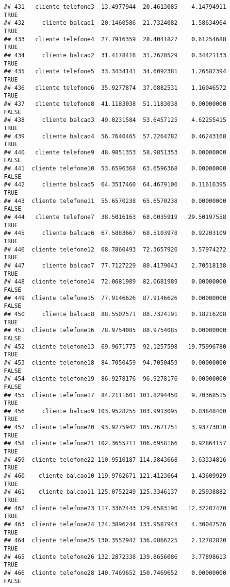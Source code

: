 \documentclass[
]{article}
\begin{document}
\begin{verbatim}
## 431   cliente telefone3  13.4977944  20.4613085    4.14794911     TRUE
## 432     cliente balcao1  20.1460586  21.7324082    1.58634964     TRUE
## 433   cliente telefone4  27.7916359  28.4041827    0.61254688     TRUE
## 434     cliente balcao2  31.4178416  31.7620529    0.34421133     TRUE
## 435   cliente telefone5  33.3434141  34.6092381    1.26582394     TRUE
## 436   cliente telefone6  35.9277874  37.0882531    1.16046572     TRUE
## 437   cliente telefone8  41.1183038  51.1183038    0.00000000    FALSE
## 438     cliente balcao3  49.0231584  53.6457125    4.62255415     TRUE
## 439     cliente balcao4  56.7640465  57.2264782    0.46243168     TRUE
## 440   cliente telefone9  48.9851353  58.9851353    0.00000000    FALSE
## 441  cliente telefone10  53.6596368  63.6596368    0.00000000    FALSE
## 442     cliente balcao5  64.3517460  64.4679100    0.11616395     TRUE
## 443  cliente telefone11  55.6570238  65.6570238    0.00000000    FALSE
## 444   cliente telefone7  38.5016163  68.0035919   29.50197558     TRUE
## 445     cliente balcao6  67.5883667  68.5103978    0.92203109     TRUE
## 446  cliente telefone12  68.7860493  72.3657920    3.57974272     TRUE
## 447     cliente balcao7  77.7127229  80.4179043    2.70518138     TRUE
## 448  cliente telefone14  72.0681989  82.0681989    0.00000000    FALSE
## 449  cliente telefone15  77.9146626  87.9146626    0.00000000    FALSE
## 450     cliente balcao8  88.5502571  88.7324191    0.18216208     TRUE
## 451  cliente telefone16  78.9754085  88.9754085    0.00000000    FALSE
## 452  cliente telefone13  69.9671775  92.1257598   19.75996780     TRUE
## 453  cliente telefone18  84.7050459  94.7050459    0.00000000    FALSE
## 454  cliente telefone19  86.9278176  96.9278176    0.00000000    FALSE
## 455  cliente telefone17  84.2111601 101.8294450    9.70368515     TRUE
## 456     cliente balcao9 103.9528255 103.9913095    0.03848400     TRUE
## 457  cliente telefone20  93.9275942 105.7671751    3.93773010     TRUE
## 458  cliente telefone21 102.3655711 106.6958166    0.92864157     TRUE
## 459  cliente telefone22 110.9510187 114.5843668    3.63334816     TRUE
## 460    cliente balcao10 119.9762671 121.4123664    1.43609929     TRUE
## 461    cliente balcao11 125.0752249 125.3346137    0.25938882     TRUE
## 462  cliente telefone23 117.3362443 129.6583190   12.32207470     TRUE
## 463  cliente telefone24 124.3896244 133.9587943    4.30047526     TRUE
## 464  cliente telefone25 130.3552942 136.0866225    2.12782820     TRUE
## 465  cliente telefone26 132.2872338 139.8656086    3.77898613     TRUE
## 466  cliente telefone28 140.7469652 150.7469652    0.00000000    FALSE

\end{verbatim}
\end{document}

